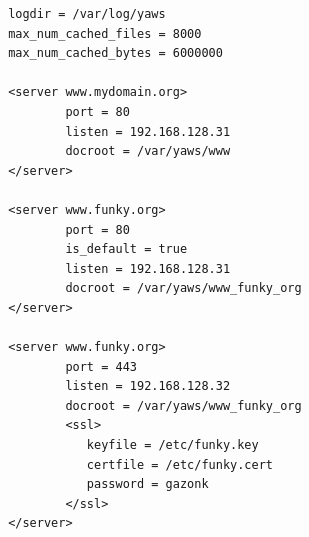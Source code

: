 \documentclass[11pt,oneside,english]{book}
\begin{document}
\begin{verbatim}
       logdir = /var/log/yaws
       max_num_cached_files = 8000
       max_num_cached_bytes = 6000000

       <server www.mydomain.org>
               port = 80
               listen = 192.168.128.31
               docroot = /var/yaws/www
       </server>

       <server www.funky.org>
               port = 80
               is_default = true
               listen = 192.168.128.31
               docroot = /var/yaws/www_funky_org
       </server>

       <server www.funky.org>
               port = 443
               listen = 192.168.128.32
               docroot = /var/yaws/www_funky_org
               <ssl>
                  keyfile = /etc/funky.key
                  certfile = /etc/funky.cert
                  password = gazonk
               </ssl>
       </server>
\end{verbatim}
\end{document}
